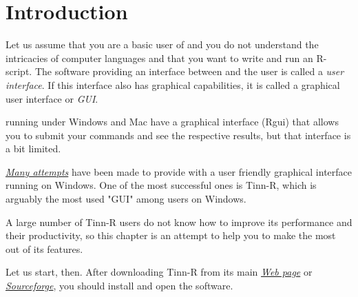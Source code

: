 
\section{Introduction}

Let us assume that you are a basic user of \RR{} and you do not understand the intricacies of computer
languages and that you want to write and run an R-script.
The software providing an interface between \RR{} and the user is called a \textit{user interface}.
If this interface also has graphical capabilities, it is called a graphical user interface or \textit{GUI}.

\RR{} running under Windows and Mac have a graphical interface (Rgui) that allows you to
submit your commands and see the respective results, but that interface is a bit limited.

\textit{\href{http://www.sciviews.org/\_rgui/}{Many attempts}} have been made to provide \RR{}
with a user friendly graphical interface running on Windows. One of the most successful ones is Tinn-R,
which is arguably the most used "GUI" among \RR{} users on Windows.

A large number of Tinn-R users do not know how to improve its performance and their productivity,
so this chapter is an attempt to help you to make the most out of its features.

Let us start, then. After downloading Tinn-R from its main
\textit{\href{https://tinn-r.org/en/}{Web page}}
or
\textit{\href{http://sourceforge.net/projects/tinn-r/}{Sourceforge}},
you should install and open the software.
